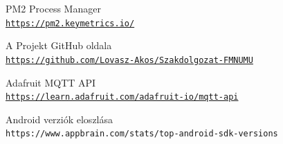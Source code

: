 \documentclass[]{thesis-ekf}
\theoremstyle{definition}
\theoremstyle{remark}
\begin{document}
\begin{thebibliography}{2}
PM2 Process Manager
\\\texttt{\url{https://pm2.keymetrics.io/}}

A Projekt GitHub oldala
\\\texttt{\url{https://github.com/Lovasz-Akos/Szakdolgozat-FMNUMU}}

Adafruit MQTT API
\\\texttt{\url{https://learn.adafruit.com/adafruit-io/mqtt-api}}

Android verziók eloszlása
\\\texttt{https://www.appbrain.com/stats/top-android-sdk-versions}
\end{thebibliography}


\end{document}
